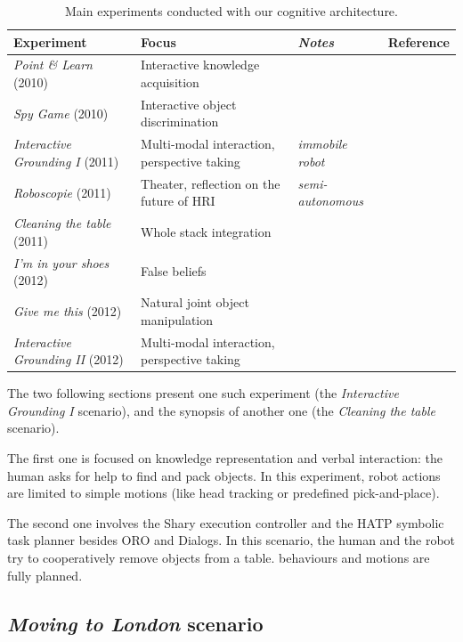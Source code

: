 \documentclass[preprint,3p,times]{elsarticle}
\begin{document}
\begin{table}
\begin{center}

\begin{tabular}{llll}
 \bf{Experiment} & Focus & \emph{Notes} & Reference \\
\hline
{\it Point \& Learn} (2010) & Interactive knowledge acquisition & & \cite{Lemaignan2010} \\
{\it Spy Game} (2010) & Interactive object discrimination & & \cite{Ros2010b} \\
{\it Interactive Grounding I} (2011) & Multi-modal interaction, perspective taking & \emph{immobile robot} & \cite{lemaignan2011what} \\
{\it Roboscopie} (2011) & Theater, reflection on the future of HRI & \emph{semi-autonomous} & \cite{lemaignan2012roboscopie} \\
{\it Cleaning the table} (2011) & Whole stack integration & & \cite{Alami2011} \\
{\it I'm in your shoes} (2012) & False beliefs & & \cite{warnier2012when} \\
{\it Give me this} (2012) & Natural joint object manipulation & & \cite{gharbi2013natural} \\
{\it Interactive Grounding II} (2012) & Multi-modal interaction, perspective taking & & \cite{lemaignan2013talking} \\
\hline

\end{tabular}
\end{center}
\caption{Main experiments conducted with our cognitive architecture.}
\label{table|experiences}
\end{table}

The two following sections present one such experiment (the {\it Interactive
Grounding I} scenario), and the synopsis of another one (the {\it Cleaning the
table} scenario).

The first one is focused on knowledge representation and verbal interaction:
the human asks for help to find and pack objects. In this experiment, robot
actions are limited to simple motions (like head tracking or predefined
pick-and-place).

The second one involves the {\sc Shary} execution controller and the HATP symbolic
task planner besides ORO and {\sc Dialogs}. In this scenario, the human and the
robot try to cooperatively remove objects from a table. behaviours and motions
are fully planned.

\subsection{\emph{Moving to London} scenario}
\end{document}
